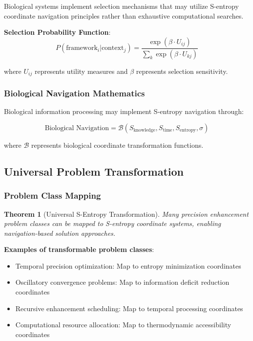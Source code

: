 \documentclass[12pt,a4paper]{article}
\newtheorem{theorem}{Theorem}[section]
\begin{document}
{{{{{{{{{{{{{Biological systems implement selection mechanisms that may utilize S-entropy coordinate navigation principles rather than exhaustive computational searches.

\textbf{Selection Probability Function}:
\begin{equation}
P(\text{framework}_i | \text{context}_j) = \frac{\exp(\beta \cdot U_{ij})}{\sum_k \exp(\beta \cdot U_{kj})}
\label{eq:framework_selection}
\end{equation}

where $U_{ij}$ represents utility measures and $\beta$ represents selection sensitivity.

\subsubsection{Biological Navigation Mathematics}

Biological information processing may implement S-entropy navigation through:

\begin{equation}
\text{Biological Navigation} = \mathcal{B}(S_{\text{knowledge}}, S_{\text{time}}, S_{\text{entropy}}, \sigma)
\label{eq:biological_navigation}
\end{equation}

where $\mathcal{B}$ represents biological coordinate transformation functions.

\subsection{Universal Problem Transformation}

\subsubsection{Problem Class Mapping}

\begin{theorem}[Universal S-Entropy Transformation]
Many precision enhancement problem classes can be mapped to S-entropy coordinate systems, enabling navigation-based solution approaches.
\end{theorem}

\textbf{Examples of transformable problem classes}:
\begin{itemize}
\item Temporal precision optimization: Map to entropy minimization coordinates
\item Oscillatory convergence problems: Map to information deficit reduction coordinates
\item Recursive enhancement scheduling: Map to temporal processing coordinates
\item Computational resource allocation: Map to thermodynamic accessibility coordinates
\end{itemize}

}}}}}}}}}}}}}
\end{document}
